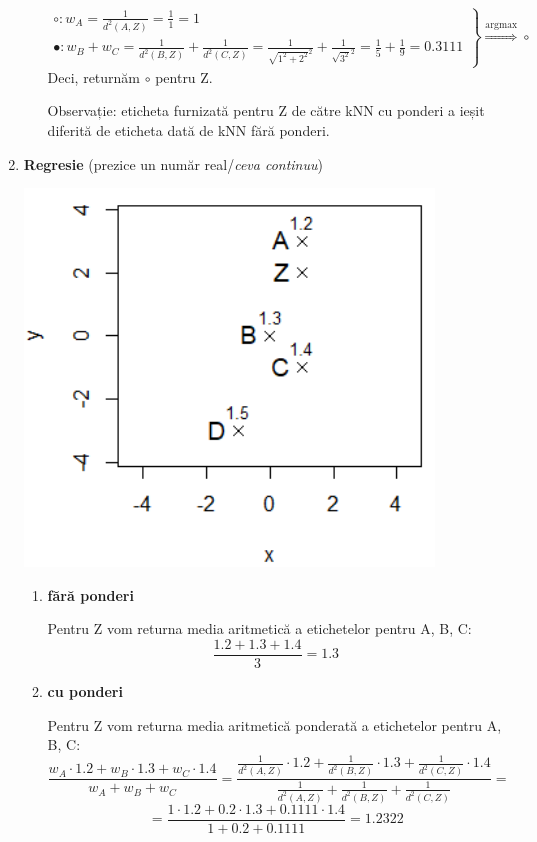 \documentclass[12pt]{article}
\begin{document}
\begin{enumerate}
\begin{enumerate}
			$$
			\left.
			\begin{array}{ll}
			\circ: w_A = \frac{1}{d^2(A,Z)} = \frac{1}{1} = 1 \\
			\bullet: w_B + w_C = \frac{1}{d^2(B,Z)} + \frac{1}{d^2(C,Z)} = \frac{1}{\sqrt{1^2 + 2^2}^2} + \frac{1}{\sqrt{3^2}^2} =  \frac{1}{5} + \frac{1}{9} = 0.3111
			\end{array}
			\right \} \stackrel{\text{argmax}}{\Rightarrow} \circ
			$$
			Deci, returnăm $\circ$ pentru Z.
			
			Observație: eticheta furnizată pentru Z de către kNN cu ponderi a ieșit diferită de eticheta dată de kNN fără ponderi.
		\end{enumerate}
		\item \textbf{Regresie} (prezice un număr real/\textit{ceva continuu})
		\begin{center}
			\includegraphics{screenshot007}
		\end{center}
	\newpage
		\begin{enumerate}
			\item \textbf{fără ponderi}
			
				Pentru Z vom returna media aritmetică a etichetelor pentru A, B, C:
				$$\frac{1.2+1.3+1.4}{3} = 1.3$$
			\item \textbf{cu ponderi}
			
				Pentru Z vom returna media aritmetică ponderată a etichetelor pentru A, B, C:
				$$\frac{w_A \cdot 1.2 + w_B \cdot 1.3 + w_C \cdot 1.4}{w_A + w_B + w_C} = \frac{\frac{1}{d^2(A,Z)} \cdot 1.2 + \frac{1}{d^2(B,Z)} \cdot 1.3 + \frac{1}{d^2(C,Z)} \cdot 1.4}{\frac{1}{d^2(A,Z)} + \frac{1}{d^2(B,Z)} + \frac{1}{d^2(C,Z)}} =$$
				$$= \frac{1 \cdot 1.2 + 0.2 \cdot 1.3 + 0.1111 \cdot 1.4}{1 + 0.2 + 0.1111} = 1.2322$$
		\end{enumerate} 
	\end{enumerate}
	
\end{document}
